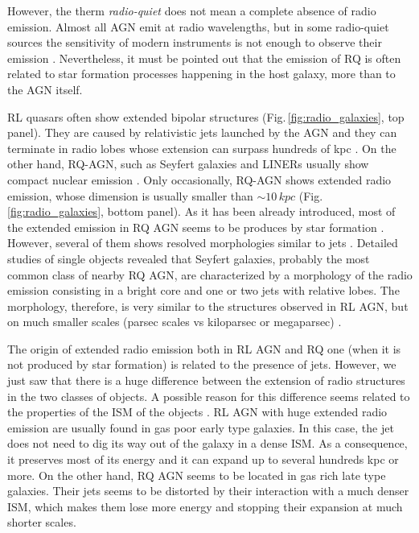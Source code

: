 \documentclass[../thesis.tex]{subfiles}
\begin{document}
However, the therm \emph{radio-quiet} does not mean a complete absence of radio emission.
Almost all AGN emit at radio wavelengths, but in some radio-quiet sources the sensitivity of modern instruments is not enough to observe their emission \citep{Kellermann16}.
Nevertheless, it must be pointed out that the emission of RQ is often related to star formation processes happening in the host galaxy, more than to the AGN itself.

RL quasars often show extended bipolar structures (Fig.\,\ref{fig:radio_galaxies}, top panel).
They are caused by relativistic jets launched by the AGN and they can terminate in radio lobes whose extension can surpass hundreds of kpc \citep[e.g][]{Fanaroff74,Perley79,Bridle94}.
On the other hand, RQ-AGN, such as Seyfert galaxies and LINERs usually show compact nuclear emission \citep{Singh15}.
Only occasionally, RQ-AGN shows extended radio emission, whose dimension is usually smaller than $\sim 10\,\si{kpc}$ (Fig.\,\ref{fig:radio_galaxies}, bottom panel).
As it has been already introduced, most of the extended emission in RQ AGN seems to be produces by star formation \citep{Baum93, Kellermann16}.
However, several of them shows resolved morphologies similar to jets \citep{Baum93,Colbert96,Morganti99,Gallimore06,Singh15, Singh15b}.
Detailed studies of single objects revealed that Seyfert galaxies, probably the most common class of nearby RQ AGN, are characterized by a morphology of the radio emission consisting in a bright core and one or two jets with relative lobes.
The morphology, therefore, is very similar to the structures observed in RL AGN, but on much smaller scales (parsec scales vs kiloparsec or megaparsec) \citep[e.g.][]{Wrobel84,Ulvestad87,Morganti99,Kukula99,Momjian03,Kharb06}.

The origin of extended radio emission both in RL AGN and RQ one (when it is not produced by star formation) is related to the presence of jets.
However, we just saw that there is a huge difference between the extension of radio structures in the two classes of objects.
A possible reason for this difference seems related to the properties of the ISM of the objects \citep{Whittle04,Gallimore06,Schawinski11,Singh15b}.
RL AGN with huge extended radio emission are usually found in gas poor early type galaxies.
In this case, the jet does not need to dig its way out of the galaxy in a dense ISM.
As a consequence, it preserves most of its energy and it can expand up to several hundreds kpc or more.
On the other hand, RQ AGN seems to be located in gas rich late type galaxies.
Their jets seems to be distorted by their interaction with a much denser ISM, which makes them lose more energy and stopping their expansion at much shorter scales.
\end{document}
